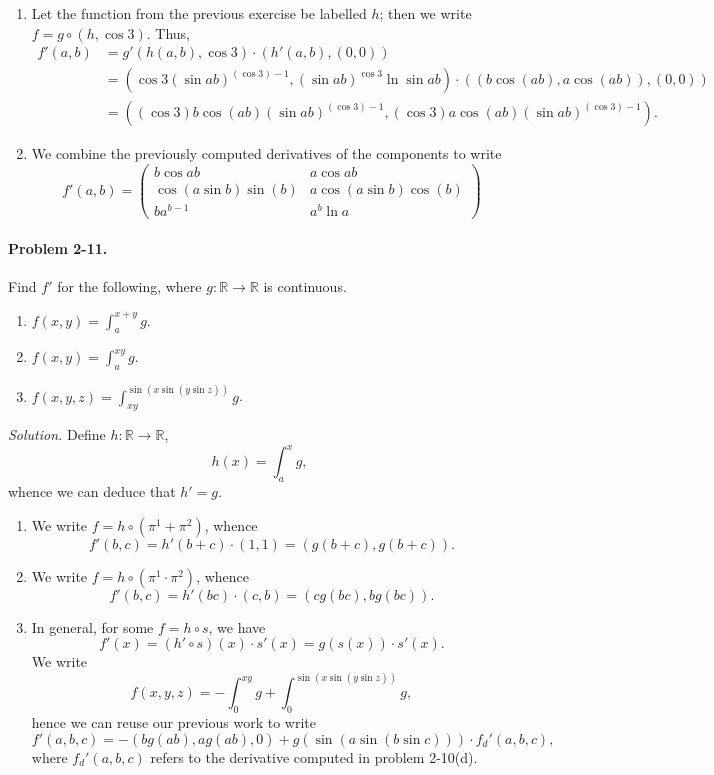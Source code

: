 \documentclass[11pt]{report}
\newcommand{\R}{\mathbb{R}}
\newcommand{\problem}[1]{\paragraph{Problem #1.}}
\newcommand{\solution}{\noindent\textit{Solution.} }
\begin{document}
\begin{enumerate}
        \item Let the function from the previous exercise be labelled $h$; then we
        write $f = g \circ (h, \cos{3})$. Thus, \begin{align*}
            f'(a, b) &= g'(h(a, b), \cos{3})\cdot (h'(a, b), (0, 0)) \\
            &= (\cos{3}(\sin{ab})^{(\cos{3}) - 1},
            (\sin{ab})^{\cos{3}}\ln{\sin{ab}})\cdot ((b\cos(ab), a\cos(ab)), (0,
            0)) \\
            &= ((\cos{3})b\cos(ab)(\sin{ab})^{(\cos{3}) - 1},
            (\cos{3})a\cos(ab)(\sin{ab})^{(\cos{3}) - 1}).
        \end{align*}

        \item We combine the previously computed derivatives of the components to
        write \[
            f'(a, b) = \begin{pmatrix}
                b\cos{ab} & a\cos{ab} \\
                \cos(a\sin{b})\sin(b) & a\cos(a\sin{b})\cos(b) \\
                ba^{b - 1} & a^b\ln{a}
            \end{pmatrix}
        \] 
    \end{enumerate}


    \problem{2-11} Find $f'$ for the following, where $g\colon \R \to \R$ is continuous.
    \begin{enumerate}
        \item $f(x, y) = \int_a^{x + y} g$.
        \item $f(x, y) = \int_a^{xy} g$.
        \item $f(x, y, z) = \int_{xy}^{\sin(x\sin(y\sin{z}))} g$.
    \end{enumerate}

    \solution Define $h\colon \R \to \R$, \[
        h(x) = \int_a^x g,
    \] whence we can deduce that $h' = g$. 
    \begin{enumerate}
        \item We write $f = h \circ (\pi^1 + \pi^2)$, whence \[
            f'(b, c) = h'(b + c) \cdot (1, 1) = (g(b + c), g(b + c)).
        \] 

        \item We write $f = h\circ(\pi^1\cdot \pi^2)$, whence \[
            f'(b, c) = h'(bc) \cdot (c, b) = (cg(bc), bg(bc)).
        \] 

        \item In general, for some $f = h\circ s$, we have \[
            f'(x) = (h'\circ s)(x) \cdot s'(x) = g(s(x))\cdot s'(x).
        \] We write \[
            f(x, y, z) = -\int_0^{xy} g + \int_0^{\sin(x\sin(y\sin{z}))} g,
        \] hence we can reuse our previous work to write \[
            f'(a, b, c) = -(b g(ab), a g(ab), 0) + g(\sin(a\sin(b\sin{c})))\cdot
            f_d'(a, b, c),
        \] where $f_d'(a, b, c)$ refers to the derivative computed in problem
        2-10(d).
    \end{enumerate}
\end{document}
